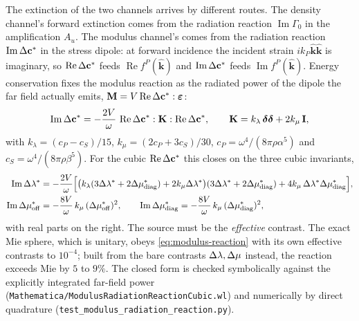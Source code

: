 The extinction of the two channels arrives by different routes. The density
channel's forward extinction comes from the radiation reaction
$\operatorname{Im}\Gamma_0$ in the amplification $A_u$. The modulus channel's
comes from the radiation reaction $\operatorname{Im}\Delta\mathbf{c}^*$ in the
stress dipole: at forward incidence the incident strain
$ik_P\hat{\bm{k}}\hat{\bm{k}}$ is imaginary, so $\operatorname{Re}\Delta\mathbf{c}^*$
feeds $\operatorname{Re} f^P(\hat{\bm{k}})$ and $\operatorname{Im}\Delta\mathbf{c}^*$
feeds $\operatorname{Im} f^P(\hat{\bm{k}})$. Energy conservation fixes the
modulus reaction as the radiated power of the dipole the far field actually
emits, $\mathbf{M} = V\operatorname{Re}\Delta\mathbf{c}^*:\bm{\varepsilon}$:
\begin{equation}
  \operatorname{Im}\Delta\mathbf{c}^*
  = -\frac{2V}{\omega}\,
    \operatorname{Re}\Delta\mathbf{c}^* : \mathbf{K} :
    \operatorname{Re}\Delta\mathbf{c}^*,
  \qquad
  \mathbf{K} = k_\lambda\,\bm{\delta}\bm{\delta} + 2k_\mu\,\mathbf{I},
  \label{eq:modulus-reaction}
\end{equation}
with $k_\lambda = (c_P - c_S)/15$, $k_\mu = (2c_P + 3c_S)/30$,
$c_P = \omega^4/(8\pi\rho\alpha^5)$ and $c_S = \omega^4/(8\pi\rho\beta^5)$. For
the cubic $\operatorname{Re}\Delta\mathbf{c}^*$ this closes on the three cubic
invariants,
\begin{align}
  \operatorname{Im}\Delta\lambda^*
  &= -\frac{2V}{\omega}\Bigl[\bigl(k_\lambda(3\Delta\lambda^* + 2\Delta\mu^*_{\mathrm{diag}})
     + 2k_\mu\Delta\lambda^*\bigr)(3\Delta\lambda^* + 2\Delta\mu^*_{\mathrm{diag}})
     + 4k_\mu\,\Delta\lambda^*\Delta\mu^*_{\mathrm{diag}}\Bigr],
  \label{eq:modulus-reaction-lambda}\\
  \operatorname{Im}\Delta\mu^*_{\mathrm{off}}
  &= -\frac{8V}{\omega}\,k_\mu\,(\Delta\mu^*_{\mathrm{off}})^2,
  \qquad
  \operatorname{Im}\Delta\mu^*_{\mathrm{diag}}
  = -\frac{8V}{\omega}\,k_\mu\,(\Delta\mu^*_{\mathrm{diag}})^2,
  \label{eq:modulus-reaction-mu}
\end{align}
with real parts on the right. The source must be the \emph{effective}
contrast. The exact Mie sphere, which is unitary, obeys
\eqref{eq:modulus-reaction} with its own effective contrasts to $10^{-4}$;
built from the bare contrasts $\Delta\lambda, \Delta\mu$ instead, the reaction exceeds
Mie by $5$ to $9\%$. The closed form is checked symbolically against the
explicitly integrated far-field power
(\texttt{Mathematica/ModulusRadiationReactionCubic.wl}) and numerically by
direct quadrature (\texttt{test\_modulus\_radiation\_reaction.py}).

